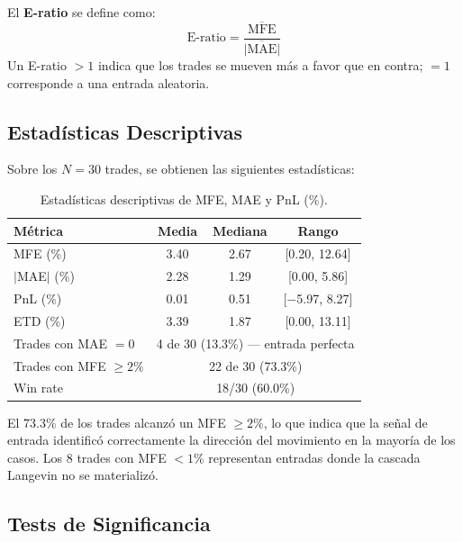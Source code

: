 \documentclass[11pt,a4paper]{article}
\begin{document}
El \textbf{E-ratio} \cite{celanbryant2021mae} se define como:
\begin{equation}
\text{E-ratio} = \frac{\overline{\text{MFE}}}{\overline{|\text{MAE}|}}
\label{eq:eratio}
\end{equation}
Un E-ratio $> 1$ indica que los trades se mueven m\'as a favor que en
contra; $= 1$ corresponde a una entrada aleatoria.


\subsection{Estad\'isticas Descriptivas}

Sobre los $N=30$ trades, se obtienen las siguientes estad\'isticas:

\begin{table}[H]
\centering
\caption{Estad\'isticas descriptivas de MFE, MAE y PnL (\%).}
\label{tab:descriptive}
\begin{tabular}{lccc}
\toprule
\textbf{M\'etrica} & \textbf{Media} & \textbf{Mediana} & \textbf{Rango} \\
\midrule
MFE (\%) & 3.40 & 2.67 & [0.20, 12.64] \\
$|$MAE$|$ (\%) & 2.28 & 1.29 & [0.00, 5.86] \\
PnL (\%) & 0.01 & 0.51 & [$-$5.97, 8.27] \\
ETD (\%) & 3.39 & 1.87 & [0.00, 13.11] \\
\midrule
Trades con MAE $= 0$ & \multicolumn{3}{c}{4 de 30 (13.3\%) --- entrada perfecta} \\
Trades con MFE $\geq 2\%$ & \multicolumn{3}{c}{22 de 30 (73.3\%)} \\
Win rate & \multicolumn{3}{c}{18/30 (60.0\%)} \\
\bottomrule
\end{tabular}
\end{table}

\begin{tcolorbox}[infobox, title=Interpretaci\'on del MFE]
El 73.3\% de los trades alcanz\'o un MFE $\geq 2\%$, lo que indica que
la se\~nal de entrada identific\'o correctamente la direcci\'on del
movimiento en la mayor\'ia de los casos. Los 8 trades con
MFE $< 1\%$ representan entradas donde la cascada Langevin
no se materializ\'o.
\end{tcolorbox}


\subsection{Tests de Significancia}
\end{document}
